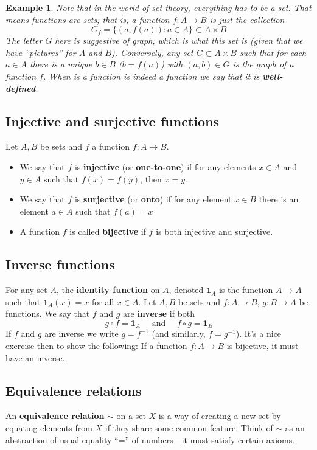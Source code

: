 \documentclass[12pt]{article}
\numberwithin{equation}{subsection}
\theoremstyle{note}
\newtheorem{example}[subsection]{Example}
\begin{document}
\begin{example} Note that in the world of set theory, everything has to be a set. That means functions are sets; that is,  a function $f\colon A\to B$ is just the collection \begin{equation} G_f= \{ (a,f(a)) : a\in A\} \subset A\times B\end{equation} The letter $G$ here is suggestive of graph, which is what this set is (given that we have ``pictures'' for $A$ and $B$). Conversely, any set $G\subset A\times B$ such that for each $a\in A$ there is a unique $b\in B$ ($b=f(a)$) with $(a,b)\in G$ is the graph of a function $f$. When is a function is indeed a function we say that it is \textbf{well-defined}.
\end{example}


\subsection{Injective and surjective functions} Let $A, B$ be sets and $f$ a function $f\colon A\to B$.
\begin{itemize}
	\item We say that $f$ is \textbf{injective} (or \textbf{one-to-one}) if for any elements $x\in A$ and $y\in A$ such that $f(x)=f(y)$, then $x=y$. 
	\item We say that $f$ is \textbf{surjective} (or \textbf{onto}) if for any element $x\in B$ there is an element $a\in A$ such that $f(a)=x$
	\item A function $f$ is called \textbf{bijective} if $f$ is both injective and surjective. 
\end{itemize}

\subsection{Inverse functions} For any set $A$, the \textbf{identity function} on $A$, denoted $\mathbf{1}_A$ is the function $A\to A$ such that $\mathbf{1}_A(x)=x$ for all $x\in A$. Let $A,B$ be sets and $f\colon A\to B$, $g\colon B\to A$ be functions. We say that $f$ and $g$ are \textbf{inverse} if both \[ g\circ f = \mathbf{1}_A \quad \text{ and } \quad f\circ g = \mathbf{1}_B\] 
If $f$ and $g$ are inverse we write $g=f^{-1}$ (and similarly, $f=g^{-1}$). It's a nice exercise then to show the following: If a function $f\colon A\to B$ is bijective, it must have an inverse. 

\subsection{Equivalence relations}
An \textbf{equivalence relation} $\sim$ on a set $X$ is a way of creating a new set by equating elements from $X$ if they share some common feature. Think of $\sim$ as an abstraction of usual equality ``='' of numbers---it must satisfy certain axioms. 
\end{document}
